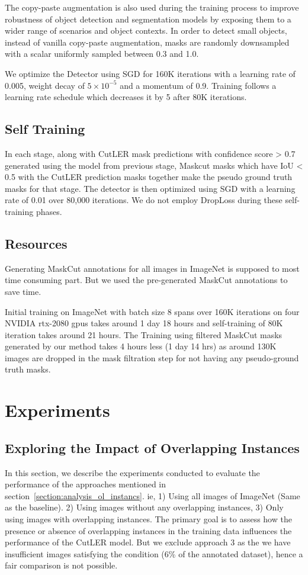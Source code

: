 The copy-paste augmentation is also used during the training process to improve robustness of object detection and segmentation models by exposing them to a wider range of scenarios and object contexts. In order to detect small objects, instead of vanilla copy-paste augmentation, masks are randomly downsampled with a scalar uniformly sampled between 0.3 and 1.0. 

We optimize the Detector using SGD for 160K iterations with a learning rate of 0.005, weight decay of \(5×10^{−5}\) and a momentum of 0.9. Training follows a learning rate schedule which decreases it by 5 after 80K iterations.

\subsection{Self Training}
In each stage, along with CutLER mask predictions with confidence score > 0.7 generated using the model from previous stage, Maskcut masks which have IoU < 0.5 with the CutLER prediction masks together make the pseudo ground truth masks for that stage. The detector is then optimized using SGD with a learning rate of 0.01 over 80,000 iterations. We do not employ DropLoss during these self-training phases.

\subsection{Resources}
Generating MaskCut annotations for all images in ImageNet is supposed to most time consuming part. But we used the pre-generated MaskCut annotations to save time.

Initial training on ImageNet with batch size 8 spans over 160K iterations on four NVIDIA rtx-2080 gpus takes around 1 day 18 hours and self-training of 80K iteration takes around 21 hours. The Training using filtered MaskCut masks generated by our method takes 4 hours less (1 day 14 hrs) as around 130K images are dropped in the mask filtration step for not having any pseudo-ground truth masks.


\section{Experiments}
\subsection{Exploring the Impact of Overlapping Instances}
\label{section:overlap_experiment}
In this section, we describe the experiments conducted to evaluate the performance of the approaches mentioned in section~\ref{section:analysis_ol_instancs}. ie, 1) Using all images of ImageNet (Same as the baseline). 2) Using images without any overlapping instances, 3)  Only using images with overlapping instances. The primary goal is to assess how the presence or absence of overlapping instances in the training data influences the performance of the CutLER model. But we exclude approach 3 as the we have insufficient images satisfying the condition (6\% of the annotated dataset), hence a fair comparison is not possible.

